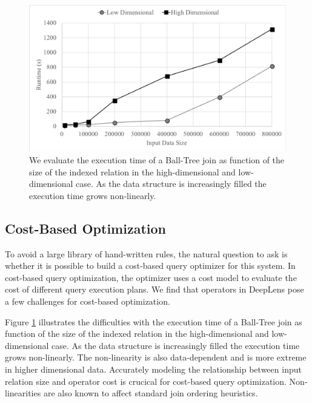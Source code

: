 \begin{figure}[t]
\centering
 \includegraphics[width=\columnwidth]{figures/spatialjoin.png}
 \caption{We evaluate the execution time of a Ball-Tree join as function of the size of the indexed relation in the high-dimensional and low-dimensional case. As the data structure is increasingly filled the execution time grows non-linearly.  \label{join} }
\end{figure}

\subsection{Cost-Based Optimization}
To avoid a large library of hand-written rules, the natural question to ask is whether it is possible to build a cost-based query optimizer for this system.
In cost-based query optimization, the optimizer uses a cost model to evaluate the cost of different query execution plans. We find that operators in \textsf{DeepLens} pose a few challenges for cost-based optimization. 

Figure \ref{join} illustrates the difficulties with the execution time of a Ball-Tree join as function of the size of the indexed relation in the high-dimensional and low-dimensional case. As the data structure is increasingly filled the execution time grows non-linearly. The non-linearity is also data-dependent and is more extreme in higher dimensional data. Accurately modeling the relationship between input relation size and operator cost is crucical for cost-based query optimization. Non-linearities are also known to affect standard join ordering heuristics.

